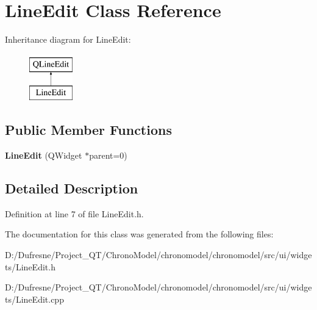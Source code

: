 \hypertarget{class_line_edit}{\section{Line\-Edit Class Reference}
\label{class_line_edit}
}
Inheritance diagram for Line\-Edit\-:\begin{figure}[H]
\begin{center}
\leavevmode
\includegraphics[height=2.000000cm]{class_line_edit}
\end{center}
\end{figure}
\subsection*{Public Member Functions}
\begin{DoxyCompactItemize}
\item 
\hypertarget{class_line_edit_a0c54dc37150c2eea45af904a8146025a}{{\bfseries Line\-Edit} (Q\-Widget $\ast$parent=0)}\label{class_line_edit_a0c54dc37150c2eea45af904a8146025a}

\end{DoxyCompactItemize}


\subsection{Detailed Description}


Definition at line 7 of file Line\-Edit.\-h.



The documentation for this class was generated from the following files\-:\begin{DoxyCompactItemize}
\item 
D\-:/\-Dufresne/\-Project\-\_\-\-Q\-T/\-Chrono\-Model/chronomodel/chronomodel/src/ui/widgets/Line\-Edit.\-h\item 
D\-:/\-Dufresne/\-Project\-\_\-\-Q\-T/\-Chrono\-Model/chronomodel/chronomodel/src/ui/widgets/Line\-Edit.\-cpp\end{DoxyCompactItemize}
